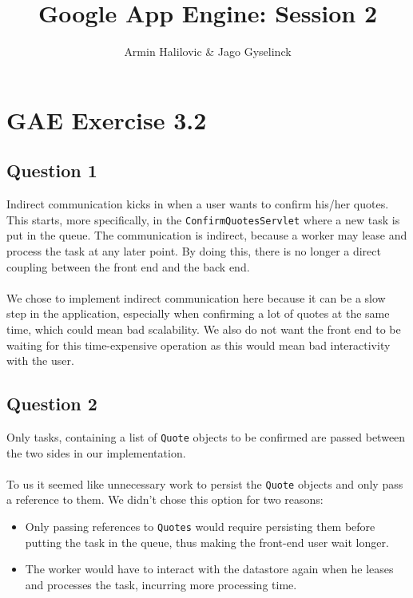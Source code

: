 \documentclass[]{article}
\title{Google App Engine: Session 2 }
\author{Armin Halilovic \& Jago Gyselinck}
\begin{document}
\maketitle

\section{GAE Exercise 3.2}

\subsection{Question 1}

Indirect communication kicks in when a user wants to confirm his/her quotes. This starts, more specifically, in the \texttt{ConfirmQuotesServlet} where a new task is put in the queue. The communication is indirect, because a worker may lease and process the task at any later point. By doing this, there is no longer a direct coupling between the front end and the back end.\\\\
We chose to implement indirect communication here because it can be a slow step in the application, especially when confirming a lot of quotes at the same time, which could mean bad scalability. We also do not want the front end to be waiting for this time-expensive operation as this would mean bad interactivity with the user.

\subsection{Question 2}
Only tasks, containing a list of \texttt{Quote} objects to be confirmed are passed between the two sides in our implementation. \\\\
To us it seemed like unnecessary work to persist the \texttt{Quote} objects and only pass a reference to them. We didn't chose this option for two reasons:

\begin{itemize}
	\item Only passing references to \texttt{Quotes} would require persisting them before putting the task in the queue, thus making the front-end user wait longer.
	\item The worker would have to interact with the datastore again when he leases and processes the task, incurring more processing time.
\end{itemize}
\end{document}
